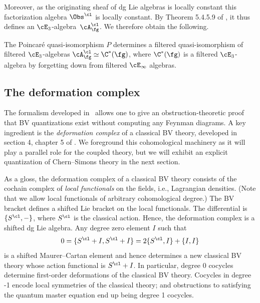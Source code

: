 \documentclass[10pt]{amsart}
\begin{document}
Moreover, as the originating sheaf of dg Lie algebras is locally constant
this factorization algebra $\Obs^\cl$ is locally constant.
By Theorem 5.4.5.9 of \cite{LurHA}, it thus defines an $\cE_3$-algebra~$\cA^\cl_\fg$.
We therefore obtain the following.

\begin{lmm}
\label{poin}
The Poincar\'e quasi-isomorphism $P$ determines a filtered quasi-isomorphism of filtered $\cE_3$-algebras
$\cA_\fg^\cl \simeq \C^*(\fg)$,
where $\C^*(\fg)$ is a filtered $\cE_3$-algebra by forgetting down from filtered $\cE_\infty$ algebras.
\end{lmm}


\subsection{The deformation complex}
\label{subsec: def cplx for CS}

The formalism developed in~\cite{CosBook} allows one to give an obstruction-theoretic proof that BV quantizations exist without computing any Feynman diagrams.
A key ingredient is the {\em deformation complex} of a classical BV theory,
developed in section 4, chapter 5 of \cite{CosBook}.
We foreground this cohomological machinery as it will play a parallel role for the coupled theory,
but we will exhibit an explicit quantization of Chern--Simons theory in the next section.

As a gloss, the deformation complex of a classical BV theory consists of the cochain complex of {\em local functionals} on the fields,
i.e., Lagrangian densities.
(Note that we allow local functionals of arbitrary cohomological degree.)
The BV bracket defines a shifted Lie bracket on the local functionals.
The differential is $\{S^{\cl},-\}$, where $S^{\cl}$ is the classical action.
Hence, the deformation complex is a shifted dg Lie algebra.
Any degree zero element $I$ such that
\[
0 = \{S^{\cl} + I, S^{\cl} + I\} = 2 \{S^{\cl}, I\} + \{I,I\}
\]
is a shifted Maurer--Cartan element and hence determines a new classical BV theory 
whose action functional is $S^{\cl} + I$.
In particular, degree 0 cocycles determine first-order deformations of the classical BV theory.
Cocycles in degree -1 encode local symmetries of the classical theory;
and obstructions to satisfying the quantum master equation end up being degree 1 cocycles.
\end{document}
